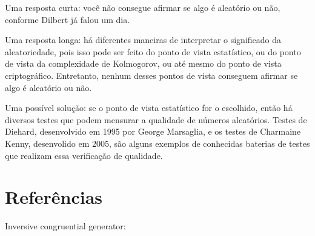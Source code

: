 \documentclass[12pt]{article}
\begin{document}
Uma resposta curta: você não consegue afirmar se algo é aleatório ou não,
conforme Dilbert já falou um dia.

Uma resposta longa: há diferentes maneiras de interpretar o significado da
aleatoriedade, pois isso pode ser feito do ponto de vista estatístico, ou do
ponto de vista da complexidade de Kolmogorov, ou até mesmo do ponto de vista
criptográfico. Entretanto, nenhum desses pontos de vista conseguem afirmar se
algo é aleatório ou não.

Uma possível solução: se o ponto de vista estatístico for o escolhido, então há
diversos testes que podem mensurar a qualidade de números aleatórios. Testes de
Diehard, desenvolvido em 1995 por George Marsaglia, e os testes de Charmaine
Kenny, desenvolido em 2005, são alguns exemplos de conhecidas baterias de testes
que realizam essa verificação de qualidade.

\section{Referências}
Inversive congruential generator:
\end{document}
